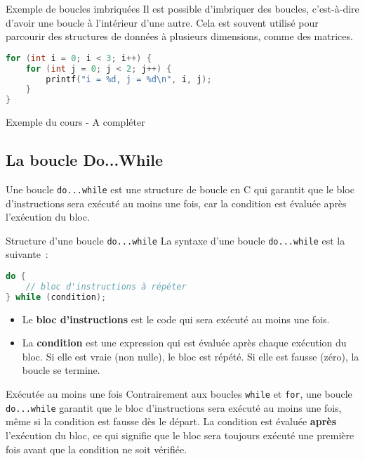\begin{UPSTIinfor}{Exemple de boucles imbriquées}
	Il est possible d'imbriquer des boucles, c'est-à-dire d'avoir une boucle à l'intérieur d'une autre. Cela est souvent utilisé pour parcourir des structures de données à plusieurs dimensions, comme des matrices.
	\begin{lstlisting}[language=c]
for (int i = 0; i < 3; i++) {
	for (int j = 0; j < 2; j++) {
		printf("i = %d, j = %d\n", i, j);
	}
}	
\end{lstlisting}

\end{UPSTIinfor}


\begin{UPSTIinfor}{Exemple du cours - A compléter}
\vspace{10cm}
\end{UPSTIinfor}

\subsection{La boucle Do...While}
Une boucle \texttt{do...while} est une structure de boucle en C qui garantit que le bloc d'instructions sera exécuté au moins une fois, car la condition est évaluée après l'exécution du bloc.

\begin{UPSTIinfor}{Structure d'une boucle \texttt{do...while}}
	La syntaxe d'une boucle \texttt{do...while} est la suivante :
	\begin{lstlisting}[language=c]
do {
    // bloc d'instructions à répéter
} while (condition);
\end{lstlisting}
	\begin{itemize}
		\item Le \textbf{bloc d'instructions} est le code qui sera exécuté au moins une fois.
		\item La \textbf{condition} est une expression qui est évaluée après chaque exécution du bloc. Si elle est vraie (non nulle), le bloc est répété. Si elle est fausse (zéro), la boucle se termine.
	\end{itemize}
\end{UPSTIinfor}

\begin{UPSTIwarning}{Exécutée au moins une fois}
	Contrairement aux boucles \texttt{while} et \texttt{for}, une boucle \texttt{do...while} garantit que le bloc d'instructions sera exécuté au moins une fois, même si la condition est fausse dès le départ.
	La condition est évaluée \textbf{après} l'exécution du bloc, ce qui signifie que le bloc sera toujours exécuté une première fois avant que la condition ne soit vérifiée.
\end{UPSTIwarning}